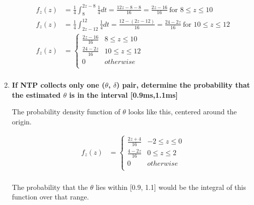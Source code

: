 \documentclass[12pt,a4paper]{article}
\begin{document}
\begin{enumerate}[label=(\alph*)]
    \begin{equation*}
        \begin{split}
            f_z(z) &= \frac{1}{4} \int_{8}^{2z-8} \frac{1}{4} dt     = \frac{12z - 8 - 8}{16} = \frac{2z - 16}{16} \ \text{for $8 \leq z \leq 10$} \\
            f_z(z) &= \frac{1}{4} \int_{2z-12}^{12} \frac{1}{4} dt   = \frac{12 - (2z - 12)}{16} = \frac{24 - 2z}{16} \ \text{for $10 \leq z \leq 12$} \\
            f_z(z) &= 
            \begin{cases}
                  \frac{2z - 16}{16}    & 8 \leq z \leq 10 \\
                  \frac{24 - 2z}{16}    & 10 \leq z \leq 12 \\
                  0          & otherwise \\
            \end{cases} \\
        \end{split}
    \end{equation*}



\clearpage

\item \textbf{If NTP collects only one ($\theta$, $\delta$) pair, determine the probability that the estimated $\theta$ is in the interval [0.9ms,1.1ms]}

The probability density function of $\theta$ looks like this, centered around the origin.

    \begin{equation*}
        \begin{split}
            f_z(z) &=
            \begin{cases}
                  \frac{2z + 4}{16}    & -2 \leq z \leq 0 \\
                  \frac{4 - 2z}{16}    & 0 \leq z \leq 2 \\
                  0         & otherwise \\
            \end{cases} \\
        \end{split}
    \end{equation*}

The probability that the $\theta$ lies within [0.9, 1.1] would be the integral of this function over that range.


\end{enumerate}
\end{document}
